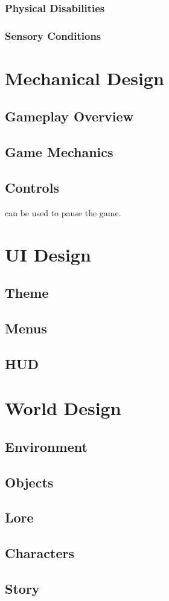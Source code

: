 \subsubsection{Physical Disabilities}
\subsubsection{Sensory Conditions}

\section{Mechanical Design}
\subsection{Gameplay Overview}
\subsection{Game Mechanics}
\subsection{Controls}

 can be used to pause the game.

\section{UI Design}
\subsection{Theme}
\subsection{Menus}
\subsection{HUD}

\section{World Design}
\subsection{Environment}
\subsection{Objects}
\subsection{Lore}
\subsection{Characters}
\subsection{Story}

